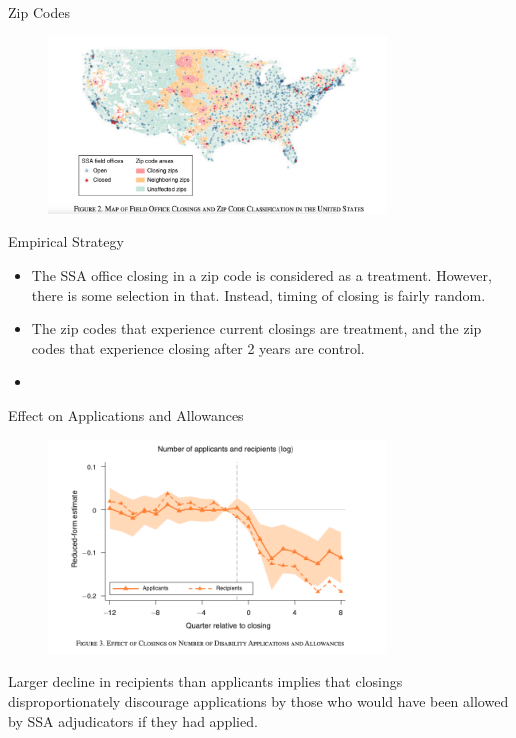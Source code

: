 \documentclass{beamer}
\begin{document}
\begin{frame}{Zip Codes}
    \begin{figure}
        \centering
        \includegraphics[width=0.8\textwidth]{F2.png}
    \end{figure}
\end{frame}

\begin{frame}{Empirical Strategy}
    \begin{itemize}
        \item The SSA office closing in a zip code is considered as a treatment. However, there is some selection in that. Instead, timing of closing is fairly random.
        \item The zip codes that experience current closings are treatment, and the zip codes that experience closing after 2 years are control. 
        \item 
    \end{itemize}
\end{frame}


\begin{frame}{Effect on Applications and Allowances}
    \begin{figure}
        \centering
        \includegraphics[width=0.8\textwidth]{F3.png}
    \end{figure}
    Larger decline in recipients than applicants implies that closings disproportionately
discourage applications by those who would have been allowed by SSA adjudicators if they had applied.
\end{frame}
\end{document}
